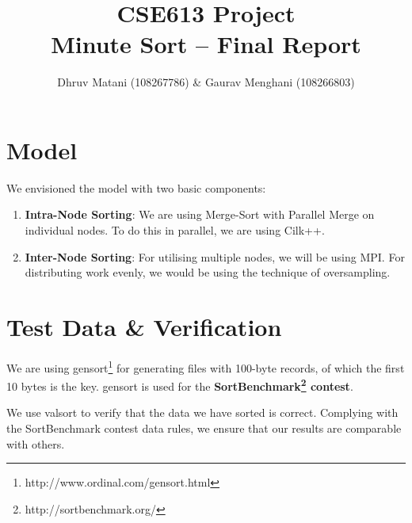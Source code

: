 \documentclass{article}
\title{CSE613 Project\\Minute Sort -- Final Report}
\author{Dhruv Matani (108267786) \& Gaurav Menghani (108266803)}
\begin{document}
\maketitle

\clearpage

\section{Model}
We envisioned the model with two basic components:
\begin{enumerate}
\item {\bf{Intra-Node Sorting}}: We are using Merge-Sort with Parallel Merge on individual nodes. To do this in parallel, 
we are using Cilk++. 

\item {\bf{Inter-Node Sorting}}: For utilising multiple nodes, we will be using MPI. For distributing work evenly, 
we would be using the technique of oversampling.
\end{enumerate}

\section{Test Data \& Verification}
We are using gensort\footnote{http://www.ordinal.com/gensort.html} for generating files with 100-byte records, 
of which the first 10 bytes is the key. gensort is used for the {\bf SortBenchmark\footnote{http://sortbenchmark.org/} contest}.

We use valsort to verify that the data we have sorted is correct. Complying with the SortBenchmark contest data
rules, we ensure that our results are comparable with others.
\end{document}
